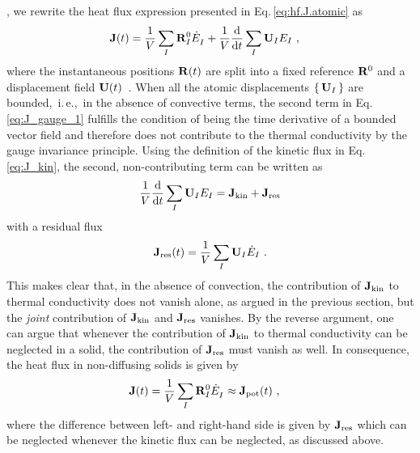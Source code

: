 , we rewrite the heat flux expression presented in Eq.\,\eqref{eq:hf.J.atomic} as
\begin{align}
	\b J (t) 
	&= \frac{1}{V} \sum_I \b R_I^0 \fD{\dot{E}}_I + { \frac{1}{V} \frac{\d}{\d t} \sum_I \b U_I E_I}~,
	\label{eq:J_gauge_1}
\end{align}
where the instantaneous positions ${\bf R} (t)$ are split into a fixed reference ${\bf R}^0$ and a displacement field ${\bf U} (t)$~\cite{Isaeva2019}. When all the atomic displacements $\set{{\bf U}_I}$ are bounded,~i.\,e.,~in the absence of convective terms, the second term in Eq.\,\eqref{eq:J_gauge_1} fulfills the condition of being the time derivative of a bounded vector field and therefore does not contribute to the thermal conductivity by the gauge invariance principle. Using the definition of the kinetic flux in Eq.\,\eqref{eq:J_kin}, the second, non-contributing term can be written as
\begin{align}
	\frac{1}{V} \frac{\d}{\d t} \sum_I \b U_I E_I
		= {\bf J}_{\rm kin} + {\bf J}_{\rm res}
	\label{eq:J_gauge_2}
\end{align}
with a residual flux %
\begin{align}
	{\bf J}_{\rm res} (t)
		= \frac{1}{V} \sum_I \b U_I \dot E_I~.
	\label{eq:J_gauge_3}
\end{align}
This makes clear that, in the absence of convection, the contribution of ${\bf J}_{\rm kin}$ to thermal conductivity does not vanish alone, as argued in the previous section, but the \emph{joint} contribution of ${\bf J}_{\rm kin}$ and ${\bf J}_{\rm res}$ vanishes. By the reverse argument, one can argue that whenever the contribution of ${\bf J}_{\rm kin}$ to thermal conductivity can be neglected in a solid, the contribution of ${\bf J}_{\rm res}$ must vanish as well. In consequence, the heat flux in non-diffusing solids is given by
\begin{align}
	\b J (t) 
		&= \frac{1}{V} \sum_I \b R_I^0 \fD{\dot{E}}_I
		\approx {\bf J}_{\rm pot} (t)~,
	\label{eq:J_tot_solid}
\end{align}
where the difference between left- and right-hand side is given by ${\bf J}_{\rm res}$ which can be neglected whenever the kinetic flux can be neglected, as discussed above.

